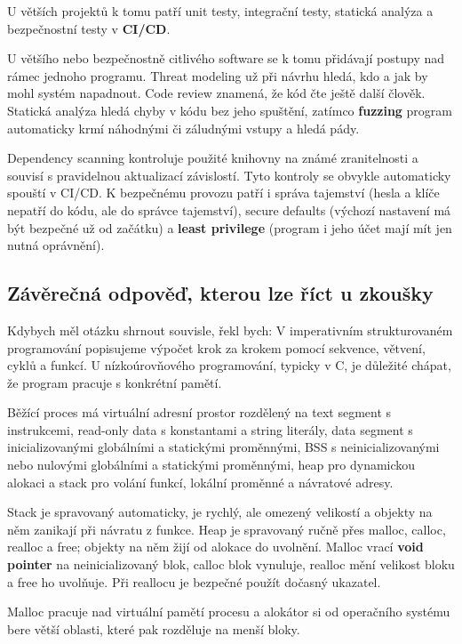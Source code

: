 U větších projektů k tomu patří unit testy, integrační testy, statická analýza a bezpečnostní testy v \textbf{CI/CD}.

U většího nebo bezpečnostně citlivého software se k tomu přidávají postupy nad rámec jednoho programu. Threat modeling už při návrhu hledá, kdo a jak by mohl systém napadnout. Code review znamená, že kód čte ještě další člověk. Statická analýza hledá chyby v kódu bez jeho spuštění, zatímco \textbf{fuzzing} program automaticky krmí náhodnými či záludnými vstupy a hledá pády.

Dependency scanning kontroluje použité knihovny na známé zranitelnosti a souvisí s pravidelnou aktualizací závislostí. Tyto kontroly se obvykle automaticky spouští v CI/CD. K bezpečnému provozu patří i správa tajemství (hesla a klíče nepatří do kódu, ale do správce tajemství), secure defaults (výchozí nastavení má být bezpečné už od začátku) a \textbf{least privilege} (program i jeho účet mají mít jen nutná oprávnění).

\subsection*{Závěrečná odpověď, kterou lze říct u zkoušky}

Kdybych měl otázku shrnout souvisle, řekl bych: V imperativním strukturovaném programování popisujeme výpočet krok za krokem pomocí sekvence, větvení, cyklů a funkcí. U nízkoúrovňového programování, typicky v C, je důležité chápat, že program pracuje s konkrétní pamětí.

Běžící proces má virtuální adresní prostor rozdělený na text segment s instrukcemi, read-only data s konstantami a string literály, data segment s inicializovanými globálními a statickými proměnnými, BSS s neinicializovanými nebo nulovými globálními a statickými proměnnými, heap pro dynamickou alokaci a stack pro volání funkcí, lokální proměnné a návratové adresy.

Stack je spravovaný automaticky, je rychlý, ale omezený velikostí a objekty na něm zanikají při návratu z funkce. Heap je spravovaný ručně přes malloc, calloc, realloc a free; objekty na něm žijí od alokace do uvolnění. Malloc vrací \textbf{void pointer} na neinicializovaný blok, calloc blok vynuluje, realloc mění velikost bloku a free ho uvolňuje. Při reallocu je bezpečné použít dočasný ukazatel.

Malloc pracuje nad virtuální pamětí procesu a alokátor si od operačního systému bere větší oblasti, které pak rozděluje na menší bloky.

